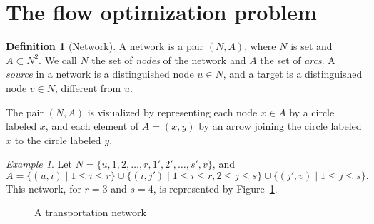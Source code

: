 \documentclass{amsbook}
\theoremstyle{definition}
\newtheorem{definition}[theorem]{Definition}
\theoremstyle{remark}
\newtheorem{example}[theorem]{Example}
\begin{document}
\section{The flow optimization problem}
\label{sec:flow-optim-probl}
\begin{definition}[Network]
  A network is a pair $(N,A)$, where $N$ is set and $A\subset N^2$.
  We call $N$ the set of \emph{nodes} of the network and $A$ the set of \emph{arcs}.
  A \emph{source} in a network is a distinguished node $u\in N$, and a target is a distinguished node $v\in N$, different from $u$.
\end{definition}
The pair $(N,A)$ is visualized by representing each node $x\in A$ by a circle labeled $x$, and each element of $A=(x,y)$ by an arrow joining the circle labeled $x$ to the circle labeled $y$.
\begin{example}
  Let $N=\{u,1,2,\dotsc,r,1',2',\dotsc,s',v\}$, and
  \begin{displaymath}
    A = \{(u,i)\mid 1\leq i\leq r\}\cup\{(i,j')\mid 1\leq i\leq r,2\leq j\leq s\}\cup\{(j',v)\mid 1\leq j\leq s\}.
  \end{displaymath}
  This network, for $r=3$ and $s=4$, is represented by Figure~\ref{fig:transport}.
  \begin{figure}
    \begin{center}
    \end{center}
    \caption{A transportation network}
    \label{fig:transport}
  \end{figure}
\end{example}
\end{document}
